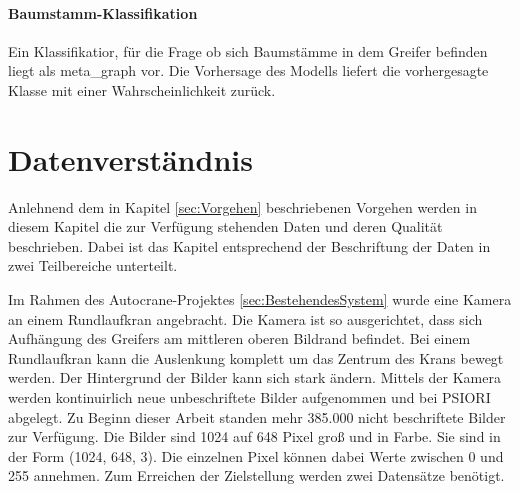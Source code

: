	\paragraph{Baumstamm-Klassifikation} 
	Ein Klassifikatior, für die Frage ob sich Baumstämme in dem Greifer befinden liegt als meta\_graph vor. Die Vorhersage des Modells liefert die vorhergesagte Klasse mit einer Wahrscheinlichkeit zurück.

	\section{Datenverständnis}
	\label{sec:DataUnderstanding}
	Anlehnend dem in Kapitel \ref{sec:Vorgehen} beschriebenen Vorgehen  werden in diesem Kapitel die zur Verfügung stehenden Daten und deren Qualität beschrieben. Dabei ist das Kapitel entsprechend der Beschriftung der Daten in zwei Teilbereiche unterteilt.
	
	Im Rahmen des Autocrane-Projektes \ref{sec:BestehendesSystem}  wurde eine Kamera an einem Rundlaufkran angebracht. Die Kamera ist so ausgerichtet, dass sich Aufhängung des Greifers am mittleren oberen Bildrand befindet. Bei einem Rundlaufkran kann die Auslenkung komplett um das Zentrum des Krans bewegt werden. Der Hintergrund der Bilder kann sich stark ändern. Mittels der Kamera werden kontinuirlich neue unbeschriftete Bilder aufgenommen und bei PSIORI abgelegt. Zu Beginn dieser Arbeit standen mehr 385.000 nicht beschriftete Bilder zur Verfügung. Die Bilder sind 1024 auf 648 Pixel groß und in Farbe. Sie sind in der Form (1024, 648, 3). Die einzelnen Pixel können dabei Werte zwischen 0 und 255 annehmen. 
	Zum Erreichen der Zielstellung werden zwei Datensätze benötigt.
	
